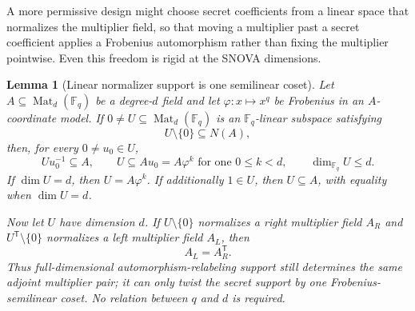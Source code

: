 \documentclass[11pt]{article}
\newtheorem{lemma}[lemma]{Lemma}
\newcommand{\F}{\mathbb F}
\newcommand{\Mat}{\operatorname{Mat}}
\newcommand{\transpose}{\mathsf T}
\begin{document}
A more permissive design might choose secret coefficients from a linear
space that normalizes the multiplier field, so that moving a multiplier past
a secret coefficient applies a Frobenius automorphism rather than fixing the
multiplier pointwise.  Even this freedom is rigid at the SNOVA dimensions.

\begin{lemma}[Linear normalizer support is one semilinear coset]
\label{lem:linear-normalizer-support}
Let $A\subseteq\Mat_d(\F_q)$ be a degree-$d$ field and let
$\varphi:x\mapsto x^q$ be Frobenius in an $A$-coordinate model.  If
$0\ne U\subseteq\Mat_d(\F_q)$ is an $\F_q$-linear subspace satisfying
\begin{equation}
 U\setminus\{0\}\subseteq N(A),                    \label{eq:linear-support-normalizes}
\end{equation}
then, for every $0\ne u_0\in U$,
\begin{equation}
 Uu_0^{-1}\subseteq A,
 \qquad
 U\subseteq Au_0=A\varphi^k\text{ for one }0\le k<d,
 \qquad
 \dim_{\F_q}U\le d.                               \label{eq:semilinear-coset-support}
\end{equation}
If $\dim U=d$, then $U=A\varphi^k$.  If additionally $1\in U$, then
$U\subseteq A$, with equality when $\dim U=d$.

Now let $U$ have dimension $d$.  If
$U\setminus\{0\}$ normalizes a right multiplier field $A_R$ and
$U^\transpose\setminus\{0\}$ normalizes a left multiplier field $A_L$,
then
\begin{equation}
  A_L=A_R^\transpose.                              \label{eq:linear-support-adjoint-pair}
\end{equation}
Thus full-dimensional automorphism-relabeling support still determines the
same adjoint multiplier pair; it can only twist the secret support by one
Frobenius-semilinear coset.  No relation between $q$ and $d$ is required.
\end{lemma}
\end{document}
